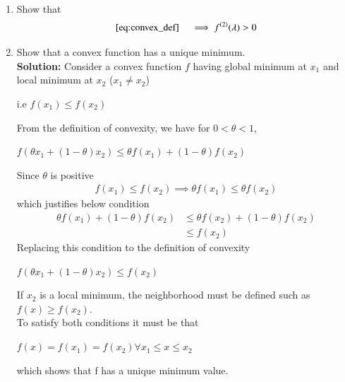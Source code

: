 \begin{enumerate}[label=\arabic*.,ref=\thesection.\theenumi]
\item Show that 
%
\begin{equation}
\eqref{eq:convex_def} \quad \implies f^{(2)}(\lambda) > 0
\end{equation}
%
\item Show that a convex function has a unique minimum.\\
%
\textbf{Solution:}
Consider a convex function $f$ having global minimum at $x_1$ and local minimum at $x_2$ ($x_1\neq x_2$)
\begin{center}
    i.e $f(x_1)\leq f(x_2)$
\end{center}
From the definition of convexity, we have for $0< \theta<1$,
\begin{center}
    $f(\theta x_1+(1 - \theta)x_2) \leq \theta f(x_1)+(1 - \theta)f(x_2) $
\end{center}
Since $\theta$ is positive
\begin{equation} 
\begin{split}
    f(x_1)\leq f(x_2)\implies\theta f(x_1)\leq \theta f(x_2)
\end{split}
\end{equation}
which justifies below condition
\begin{equation} \label{eq1}
\begin{split}
    \theta f(x_1)+(1-\theta)f(x_2) &\leq \theta f(x_2)+(1-\theta)f(x_2)\\
    &\leq f(x_2)
\end{split}
\end{equation}
Replacing this condition to the definition of convexity
\begin{center}
    $f(\theta x_1+(1-\theta)x_2) \leq f(x_2)$
\end{center}
If $x_2$ is a local minimum, the neighborhood must be defined such as $f(x)\geq f(x_2)$.\\
To satisfy both conditions it must be that 
\begin{center}
    $f(x) = f(x_1) = f(x_2) \forall x_1\leq x\leq x_2 $
\end{center}
which shows that f has a unique minimum value.
%
\end{enumerate}
%
